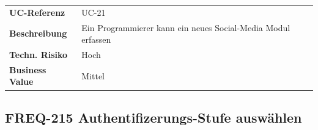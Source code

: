 \begin{longtable}[c]{@{}ll@{}}
\toprule
\begin{minipage}[t]{0.20\columnwidth}\raggedright\strut
\textbf{UC-Referenz}
\strut\end{minipage} &
\begin{minipage}[t]{0.74\columnwidth}\raggedright\strut
UC-21
\strut\end{minipage}\tabularnewline
\begin{minipage}[t]{0.20\columnwidth}\raggedright\strut
\textbf{Beschreibung}
\strut\end{minipage} &
\begin{minipage}[t]{0.74\columnwidth}\raggedright\strut
Ein Programmierer kann ein neues Social-Media Modul erfassen
\strut\end{minipage}\tabularnewline
\begin{minipage}[t]{0.20\columnwidth}\raggedright\strut
\textbf{Techn. Risiko}
\strut\end{minipage} &
\begin{minipage}[t]{0.74\columnwidth}\raggedright\strut
Hoch
\strut\end{minipage}\tabularnewline
\begin{minipage}[t]{0.20\columnwidth}\raggedright\strut
\textbf{Business Value}
\strut\end{minipage} &
\begin{minipage}[t]{0.74\columnwidth}\raggedright\strut
Mittel
\strut\end{minipage}\tabularnewline
\bottomrule
\end{longtable}

\subsection{FREQ-215 Authentifizerungs-Stufe
auswählen}\label{freq-215-authentifizerungs-stufe-auswuxe4hlen}

